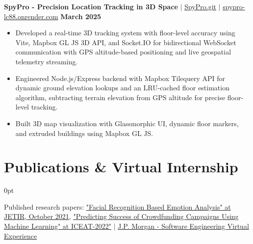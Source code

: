 \documentclass[letterpaper,10pt]{article}
\newlength{\contentindent}
\newcommand{\sectioncontent}[1]{%
  \begin{adjustwidth}{\contentindent}{0pt}%
  #1%
  \end{adjustwidth}%
}
\begin{document}
{\textbf{SpyPro - Precision Location Tracking in 3D Space} $|$ \href{https://github.com/Saurav-Kalaskar/SpyPro.git}{SpyPro.git} $|$ \href{https://spypro-lc88.onrender.com/} {spypro-lc88.onrender.com} \hfill \textbf{March 2025}
\begin{itemize}
    \item Developed a real-time 3D tracking system with floor-level accuracy using Vite, Mapbox GL JS 3D API, and Socket.IO for bidirectional WebSocket communication with GPS altitude-based positioning and live geospatial telemetry streaming.
    \item Engineered Node.js/Express backend with Mapbox Tilequery API for dynamic ground elevation lookups and an LRU-cached floor estimation algorithm, subtracting terrain elevation from GPS altitude for precise floor-level tracking.
    \item Built 3D map visualization with Glassmorphic UI, dynamic floor markers, and extruded buildings using Mapbox GL JS.
\end{itemize}
}

\section{Publications \& Virtual Internship}
\sectioncontent{
{Published research papers: \href{https://www.jetir.org/view?paper=JETIRFD06059}{"Facial Recognition Based Emotion Analysis" at JETIR, October 2021}},  \href{https://drive.google.com/file/d/1oAuZegjDGTgZXc2WC4bzxeZQ2XF0wVNs/view?usp=sharing}{"Predicting Success of Crowdfunding Campaigns Using Machine Learning" at ICEAT-2022"} $|$
\href{https://drive.google.com/file/d/1KVM6ewcn56FYNm9yJX6cdct4bhXv-Cez/view?usp=sharing}{J.P. Morgan - Software Engineering Virtual Experience}
}
\end{document}
